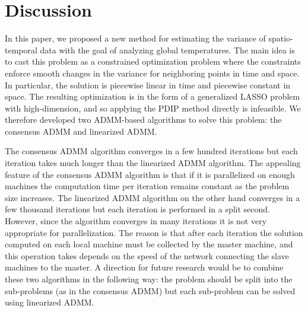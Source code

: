 \documentclass[letterpaper]{article} %
\newcommand{\autoref}{\Cref}
\begin{document}



\section{Discussion}
\label{sec:discussion}

In this paper, we proposed a new method for estimating the variance of
spatio-temporal data with the goal of analyzing global
temperatures. The main idea is to cast this problem as a 
constrained optimization problem where the constraints enforce smooth
changes in the variance for neighboring points in time and space. In
particular, the solution is piecewise linear in time and piecewise
constant in space. The resulting optimization is in the form of a
generalized LASSO problem with high-dimension, and so applying the
PDIP method directly is infeasible. We therefore developed two
ADMM-based algorithms to solve this problem: the consensus ADMM and
linearized ADMM. 

The consensus ADMM algorithm converges in a few hundred iterations
but each iteration takes much longer than the linearized ADMM
algorithm. The appealing feature of the consensus ADMM algorithm is
that if it is parallelized on enough machines the
computation time per iteration remains constant as the problem size
increases. The linearized ADMM algorithm on the other hand converges
in a few thousand iterations but each iteration is performed in a
split second. However, since the algorithm converges in many
iterations it is not very appropriate for parallelization. The reason
is that after each iteration the solution computed on each local machine
must be collected by the master machine, and this operation takes
depends on the speed of the network connecting the
slave machines to the master. A direction for future research would be
to combine these two algorithms in the following way: the problem
should be split into the sub-problems (as in the consensus ADMM) but
each sub-problem can be solved using linearized ADMM. 
\end{document}
